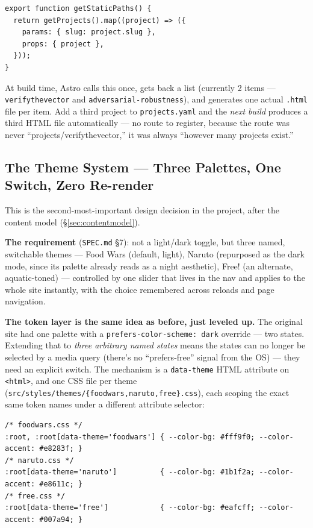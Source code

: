 \documentclass[11pt]{article}
\begin{document}
\begin{lstlisting}
export function getStaticPaths() {
  return getProjects().map((project) => ({
    params: { slug: project.slug },
    props: { project },
  }));
}
\end{lstlisting}

At build time, Astro calls this once, gets back a list (currently 2
items --- \texttt{verifythevector} and \texttt{adversarial-robustness}),
and generates one actual \texttt{.html} file per item. Add a third
project to \texttt{projects.yaml} and the \emph{next build} produces a
third HTML file automatically --- no route to register, because the
route was never ``projects/verifythevector,'' it was always ``however
many projects exist.''

\subsection{The Theme System --- Three Palettes, One Switch, Zero Re-render}
\label{sec:theming}

This is the second-most-important design decision in the project, after
the content model (\S\ref{sec:contentmodel}).

\textbf{The requirement} (\texttt{SPEC.md} \S7): not a light/dark toggle,
but three named, switchable themes --- Food Wars (default, light), Naruto
(repurposed as the dark mode, since its palette already reads as a night
aesthetic), Free! (an alternate, aquatic-toned) --- controlled by one slider that
lives in the nav and applies to the whole site instantly, with the choice
remembered across reloads and page navigation.

\textbf{The token layer is the same idea as before, just leveled up.} The
original site had one palette with a \texttt{prefers-color-scheme: dark}
override --- two states. Extending that to \emph{three arbitrary named
states} means the states can no longer be selected by a media query
(there's no ``prefers-free'' signal from the OS) --- they need an
explicit switch. The mechanism is a \texttt{data-theme} HTML attribute on
\texttt{<html>}, and one CSS file per theme
(\texttt{src/styles/themes/\{foodwars,naruto,free\}.css}), each
scoping the exact same token names under a different attribute selector:

\begin{lstlisting}
/* foodwars.css */
:root, :root[data-theme='foodwars'] { --color-bg: #fff9f0; --color-accent: #e8283f; }
/* naruto.css */
:root[data-theme='naruto']          { --color-bg: #1b1f2a; --color-accent: #e8611c; }
/* free.css */
:root[data-theme='free']            { --color-bg: #eafcff; --color-accent: #007a94; }
\end{lstlisting}
\end{document}
